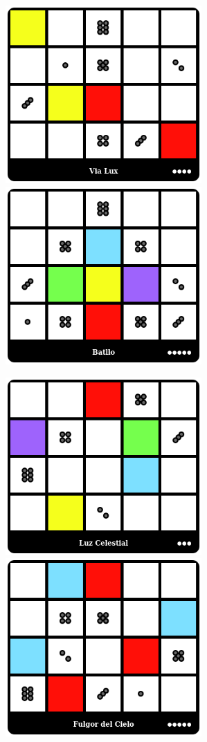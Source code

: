 \centerline{\mbox{\includegraphics[width=75mm]{img/WPC/ViaLux.png}\includegraphics[width=75mm]{img/WPC/Batllo.png}}}
\centerline{\mbox{\includegraphics[width=75mm]{img/WPC/LuzCelestial.png}\includegraphics[width=75mm]{img/WPC/FulgordelCielo.png}}}
